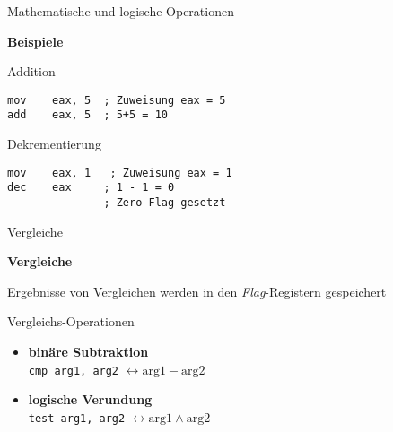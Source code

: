 \begin{frame}[fragile]{Mathematische und logische Operationen}

\begin{center}
\textbf{Beispiele}
\end{center}

Addition
\begin{lstlisting}
mov    eax, 5  ; Zuweisung eax = 5
add    eax, 5  ; 5+5 = 10 
\end{lstlisting}

\makebox{}

Dekrementierung
\begin{lstlisting}
mov    eax, 1   ; Zuweisung eax = 1
dec    eax     ; 1 - 1 = 0
               ; Zero-Flag gesetzt
\end{lstlisting}

\end{frame}

\begin{frame}{Vergleiche}

\begin{center}
\textbf{Vergleiche}
\end{center}

Ergebnisse von Vergleichen werden in den \textit{Flag}-Registern gespeichert

\makebox{}

Vergleichs-Operationen
\begin{itemize}
	\item \textbf{binäre Subtraktion}\\
		\texttt{cmp arg1, arg2} $\leftrightarrow \text{arg1} - \text{arg2}$

	\item \textbf{logische Verundung}\\
		\texttt{test arg1, arg2} $\leftrightarrow \text{arg1} \wedge \text{arg2}$
\end{itemize}
\end{frame}

